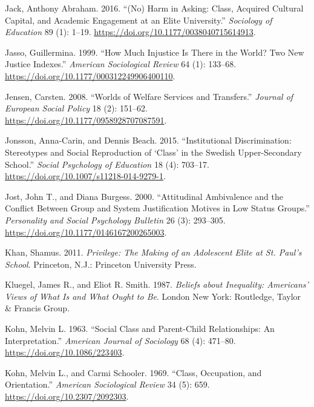 \documentclass[
  letterpaper,
  DIV=11,
  numbers=noendperiod]{scrartcl}
\newlength{\cslhangindent}
\newenvironment{CSLReferences}[2] %
 {\begin{list}{}{%
  \setlength{\itemindent}{0pt}
  \setlength{\leftmargin}{0pt}
  \setlength{\parsep}{0pt}
  \ifodd #1
   \setlength{\leftmargin}{\cslhangindent}
   \setlength{\itemindent}{-1\cslhangindent}
  \fi
  \setlength{\itemsep}{#2\baselineskip}}}
 {\end{list}}
\begin{document}
\begin{CSLReferences}{1}{0}
Jack, Anthony Abraham. 2016. {``({No}) {Harm} in {Asking}: {Class},
{Acquired Cultural Capital}, and {Academic Engagement} at an {Elite
University}.''} \emph{Sociology of Education} 89 (1): 1--19.
\url{https://doi.org/10.1177/0038040715614913}.

Jasso, Guillermina. 1999. {``How {Much Injustice} Is {There} in the
{World}? {Two New Justice Indexes}.''} \emph{American Sociological
Review} 64 (1): 133--68.
\url{https://doi.org/10.1177/000312249906400110}.

Jensen, Carsten. 2008. {``Worlds of Welfare Services and Transfers.''}
\emph{Journal of European Social Policy} 18 (2): 151--62.
\url{https://doi.org/10.1177/0958928707087591}.

Jonsson, Anna-Carin, and Dennis Beach. 2015. {``Institutional
Discrimination: {Stereotypes} and Social Reproduction of {`Class'} in
the {Swedish} Upper-Secondary School.''} \emph{Social Psychology of
Education} 18 (4): 703--17.
\url{https://doi.org/10.1007/s11218-014-9279-1}.

Jost, John T., and Diana Burgess. 2000. {``Attitudinal {Ambivalence} and
the {Conflict} Between {Group} and {System Justification Motives} in
{Low Status Groups}.''} \emph{Personality and Social Psychology
Bulletin} 26 (3): 293--305.
\url{https://doi.org/10.1177/0146167200265003}.

Khan, Shamus. 2011. \emph{Privilege: {The Making} of an {Adolescent
Elite} at {St}. {Paul}'s {School}}. Princeton, N.J.: Princeton
University Press.

Kluegel, James R., and Eliot R. Smith. 1987. \emph{Beliefs about
Inequality: {Americans}' Views of What Is and What Ought to Be}. London
New York: Routledge, Taylor \& Francis Group.

Kohn, Melvin L. 1963. {``Social {Class} and {Parent-Child
Relationships}: {An Interpretation}.''} \emph{American Journal of
Sociology} 68 (4): 471--80. \url{https://doi.org/10.1086/223403}.

Kohn, Melvin L., and Carmi Schooler. 1969. {``Class, {Occupation}, and
{Orientation}.''} \emph{American Sociological Review} 34 (5): 659.
\url{https://doi.org/10.2307/2092303}.


\end{CSLReferences}
\end{document}
